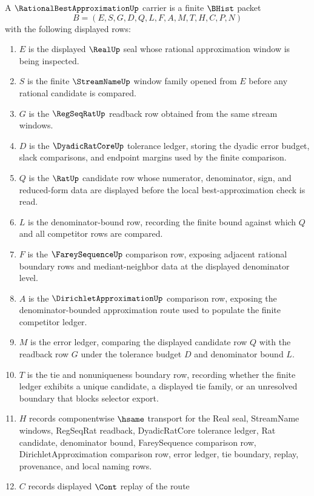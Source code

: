 \begin{definition}
\label{def:rational-best-approximation-carrier}
A $\RationalBestApproximationUp$ carrier is a finite $\BHist$ packet
$$
B=(E,S,G,D,Q,L,F,A,M,T,H,C,P,N)
$$
with the following displayed rows:
\begin{enumerate}
\item $E$ is the displayed $\RealUp$ seal whose rational approximation window is being inspected.
\item $S$ is the finite $\StreamNameUp$ window family opened from $E$ before any rational candidate is compared.
\item $G$ is the $\RegSeqRatUp$ readback row obtained from the same stream windows.
\item $D$ is the $\DyadicRatCoreUp$ tolerance ledger, storing the dyadic error budget, slack comparisons, and endpoint margins used by the finite comparison.
\item $Q$ is the $\RatUp$ candidate row whose numerator, denominator, sign, and reduced-form data are displayed before the local best-approximation check is read.
\item $L$ is the denominator-bound row, recording the finite bound against which $Q$ and all competitor rows are compared.
\item $F$ is the $\FareySequenceUp$ comparison row, exposing adjacent rational boundary rows and mediant-neighbor data at the displayed denominator level.
\item $A$ is the $\DirichletApproximationUp$ comparison row, exposing the denominator-bounded approximation route used to populate the finite competitor ledger.
\item $M$ is the error ledger, comparing the displayed candidate row $Q$ with the readback row $G$ under the tolerance budget $D$ and denominator bound $L$.
\item $T$ is the tie and nonuniqueness boundary row, recording whether the finite ledger exhibits a unique candidate, a displayed tie family, or an unresolved boundary that blocks selector export.
\item $H$ records componentwise $\hsame$ transport for the Real seal, StreamName windows, RegSeqRat readback, DyadicRatCore tolerance ledger, Rat candidate, denominator bound, FareySequence comparison row, DirichletApproximation comparison row, error ledger, tie boundary, replay, provenance, and local naming rows.
\item $C$ records displayed $\Cont$ replay of the route

\end{enumerate}
\end{definition}
